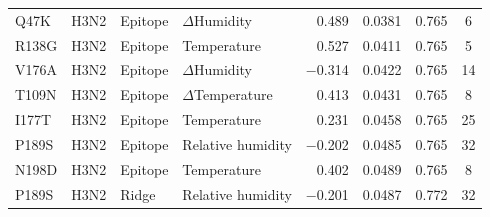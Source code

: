 \documentclass[12pt]{article}
\begin{document}
\begin{longtable}{llllrccc}
        Q47K & H3N2 & Epitope & $\Delta$Humidity & 0.489 & 0.0381 & 0.765 & 6 \\
        R138G & H3N2 & Epitope & Temperature & 0.527 & 0.0411 & 0.765 & 5 \\
        V176A & H3N2 & Epitope & $\Delta$Humidity & $-$0.314 & 0.0422 & 0.765 & 14 \\
        T109N & H3N2 & Epitope & $\Delta$Temperature & 0.413 & 0.0431 & 0.765 & 8 \\
        I177T & H3N2 & Epitope & Temperature & 0.231 & 0.0458 & 0.765 & 25 \\
        P189S & H3N2 & Epitope & Relative humidity & $-$0.202 & 0.0485 & 0.765 & 32 \\
        N198D & H3N2 & Epitope & Temperature & 0.402 & 0.0489 & 0.765 & 8 \\
        P189S & H3N2 & Ridge & Relative humidity & $-$0.201 & 0.0487 & 0.772 & 32 \\
\end{longtable}
\end{document}
